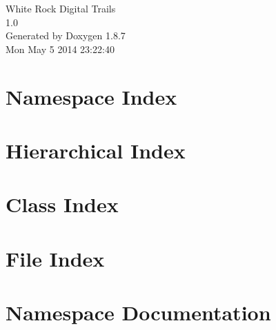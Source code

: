 \documentclass[twoside]{book}
\newcommand{\+}{\discretionary{\mbox{\scriptsize$\hookleftarrow$}}{}{}}
\newcommand{\clearemptydoublepage}{%
  \newpage{\pagestyle{empty}\cleardoublepage}%
}
\begin{document}
\hypersetup{pageanchor=false,
             bookmarks=true,
             bookmarksnumbered=true,
             pdfencoding=unicode
            }
\begin{titlepage}
\vspace*{7cm}
\begin{center}%
{\Large White Rock Digital Trails \\[1ex]\large 1.\+0 }\\
\vspace*{1cm}
{\large Generated by Doxygen 1.8.7}\\
\vspace*{0.5cm}
{\small Mon May 5 2014 23:22:40}\\
\end{center}
\end{titlepage}
\clearemptydoublepage
\tableofcontents
\clearemptydoublepage
{}
\hypersetup{pageanchor=true}

\chapter{Namespace Index}

\chapter{Hierarchical Index}

\chapter{Class Index}

\chapter{File Index}

\chapter{Namespace Documentation}











\end{document}
